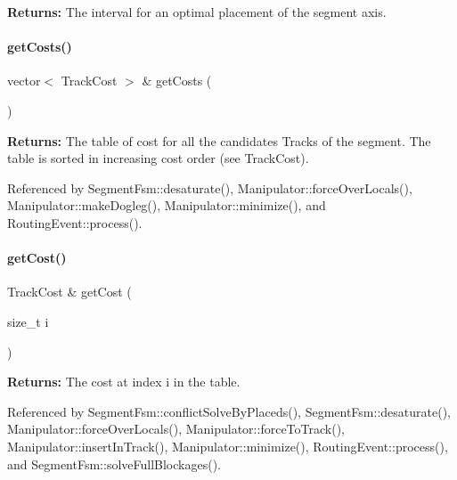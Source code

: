 {\bfseries Returns\+:} The interval for an optimal placement of the segment axis. \mbox{\label{classKite_1_1SegmentFsm_ab7144079976c8808e69f9aac68dda06d}} 
\paragraph{\texorpdfstring{get\+Costs()}{getCosts()}}
{\footnotesize\ttfamily vector$<$ Track\+Cost $>$ \& get\+Costs (\begin{DoxyParamCaption}{ }\end{DoxyParamCaption})\hspace{0.3cm}{\ttfamily [inline]}}

{\bfseries Returns\+:} The table of cost for all the candidates Tracks of the segment. The table is sorted in increasing cost order (see Track\+Cost). 

Referenced by Segment\+Fsm\+::desaturate(), Manipulator\+::force\+Over\+Locals(), Manipulator\+::make\+Dogleg(), Manipulator\+::minimize(), and Routing\+Event\+::process().

\mbox{\label{classKite_1_1SegmentFsm_a5256595f77ebc80c3ee683cfdbc7f8f6}} 
\paragraph{\texorpdfstring{get\+Cost()}{getCost()}}
{\footnotesize\ttfamily Track\+Cost \& get\+Cost (\begin{DoxyParamCaption}\item[{size\+\_\+t}]{i }\end{DoxyParamCaption})\hspace{0.3cm}{\ttfamily [inline]}}

{\bfseries Returns\+:} The cost at index {\ttfamily i} in the table. 

Referenced by Segment\+Fsm\+::conflict\+Solve\+By\+Placeds(), Segment\+Fsm\+::desaturate(), Manipulator\+::force\+Over\+Locals(), Manipulator\+::force\+To\+Track(), Manipulator\+::insert\+In\+Track(), Manipulator\+::minimize(), Routing\+Event\+::process(), and Segment\+Fsm\+::solve\+Full\+Blockages().

